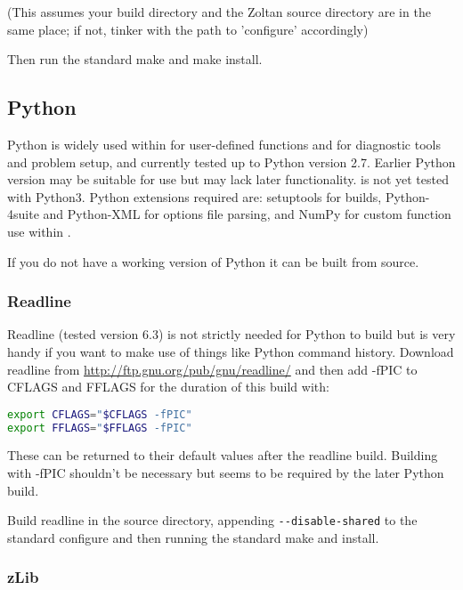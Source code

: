 (This assumes your build directory and the Zoltan source directory are in the
same place; if not, tinker with the path to 'configure' accordingly)

Then run the standard make and make install.

\subsection{Python}
\label{sec:required_libraries_python}

Python is widely used within \fluidity for user-defined functions and for
diagnostic tools and problem setup, and currently tested up to Python version
2.7. Earlier Python version may be suitable for use but may lack later
functionality. \fluidity is not yet tested with Python3. Python extensions
required are: setuptools for \fluidity builds, Python-4suite and Python-XML for
options file parsing, and NumPy for custom function use within \fluidity.

If you do not have a working version of Python it can be built from source.

\subsubsection{Readline}
\label{sec:required_libraries_python_readline}

Readline (tested version 6.3) is not strictly needed for Python to build but is
very handy if you want to make use of things like Python command history.
Download readline from \url{http://ftp.gnu.org/pub/gnu/readline/} and then add
-fPIC to CFLAGS and FFLAGS for the duration of this build with:

\begin{lstlisting}[language=bash]
export CFLAGS="$CFLAGS -fPIC"
export FFLAGS="$FFLAGS -fPIC"
\end{lstlisting}

These can be returned to their default values after the readline build.
Building with -fPIC shouldn't be necessary but seems to be required by the
later Python build.

Build readline in the source directory, appending
\lstinline[language=bash]+--disable-shared+ to the standard configure and then
running the standard make and install.

\subsubsection{zLib}
\label{sec:required_libraries_python_zlib}

